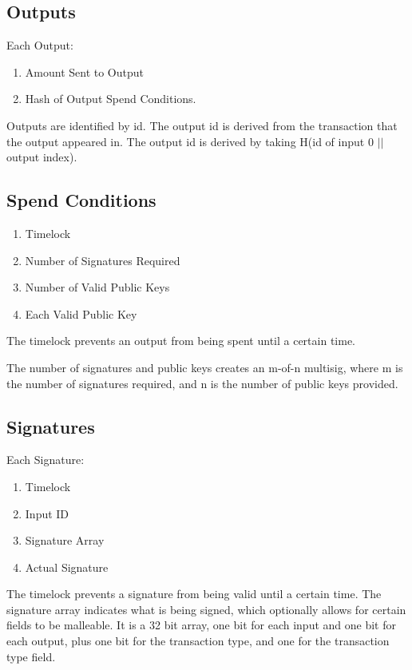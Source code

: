 \documentclass[twocolumn]{article}
\begin{document}
\subsection{Outputs}
Each Output:
\begin{enumerate}
	\item Amount Sent to Output
	\item Hash of Output Spend Conditions.
\end{enumerate}

Outputs are identified by id.
The output id is derived from the transaction that the output appeared in.
The output id is derived by taking H(id of input 0 $||$ output index).

\subsection{Spend Conditions}
\begin{enumerate}
	\item Timelock
	\item Number of Signatures Required
	\item Number of Valid Public Keys
	\item Each Valid Public Key
\end{enumerate}

The timelock prevents an output from being spent until a certain time.

The number of signatures and public keys creates an m-of-n multisig, where m is the number of signatures required, and n is the number of public keys provided.

\subsection{Signatures}
Each Signature:
\begin{enumerate}
	\item Timelock
	\item Input ID
	\item Signature Array
	\item Actual Signature
\end{enumerate}

The timelock prevents a signature from being valid until a certain time.
The signature array indicates what is being signed, which optionally allows for certain fields to be malleable.
It is a 32 bit array, one bit for each input and one bit for each output, plus one bit for the transaction type, and one for the transaction type field.
\end{document}

